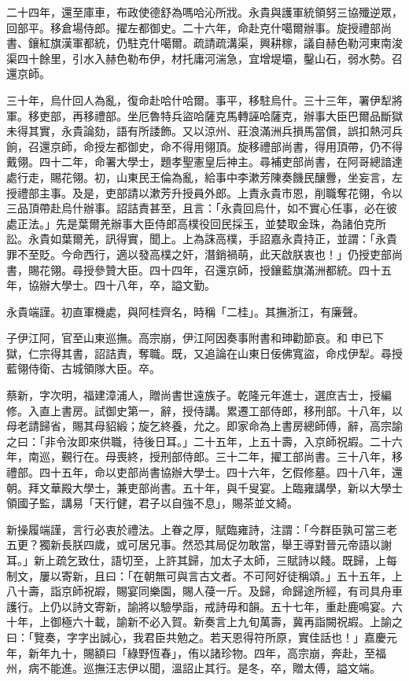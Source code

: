 \begin{pinyinscope}
二十四年，還至庫車，布政使德舒為嗎哈沁所戕。永貴與護軍統領努三協殲逆眾，回部平。移倉場侍郎。擢左都御史。二十六年，命赴克什噶爾辦事。旋授禮部尚書、鑲紅旗漢軍都統，仍駐克什噶爾。疏請疏溝渠，興耕稼，議自赫色勒河東南浚渠四十餘里，引水入赫色勒布伊，材托庸河湍急，宜增堤壩，鑿山石，弱水勢。召還京師。

三十年，烏什回人為亂，復命赴哈什哈爾。事平，移駐烏什。三十三年，署伊犁將軍。移吏部，再移禮部。坐厄魯特兵盜哈薩克馬轉誣哈薩克，辦事大臣巴爾品斷獄未得其實，永貴論劾，語有所諉飾。又以涼州、莊浪滿洲兵損馬當償，誤扣熱河兵餉，召還京師，命授左都御史，命不得用翎頂。旋移禮部尚書，得用頂帶，仍不得戴翎。四十二年，命署大學士，題孝聖憲皇后神主。尋補吏部尚書，在阿哥總諳達處行走，賜花翎。初，山東民王倫為亂，給事中李漱芳陳奏饑民釀釁，坐妄言，左授禮部主事。及是，吏部請以漱芳升授員外郎。上責永貴市恩，削職奪花翎，令以三品頂帶赴烏什辦事。詔詰責甚至，且言：「永貴回烏什，如不實心任事，必在彼處正法。」先是葉爾羌辦事大臣侍郎高樸役回民採玉，並婪取金珠，為諸伯克所訟。永貴如葉爾羌，訊得實，聞上。上為誅高樸，手詔嘉永貴持正，並謂：「永貴罪不至貶。今命西行，適以發高樸之奸，潛銷禍萌，此天啟朕衷也！」仍授吏部尚書，賜花翎。尋授參贊大臣。四十四年，召還京師，授鑲藍旗滿洲都統。四十五年，協辦大學士。四十八年，卒，謚文勤。

永貴端謹。初直軍機處，與阿桂齊名，時稱「二桂」。其撫浙江，有廉聲。

子伊江阿，官至山東巡撫。高宗崩，伊江阿因奏事附書和珅勸節哀。和申已下獄，仁宗得其書，詔詰責，奪職。既，又追論在山東日佞佛寬盜，命戍伊犁。尋授藍翎侍衛、古城領隊大臣。卒。

蔡新，字次明，福建漳浦人，贈尚書世遠族子。乾隆元年進士，選庶吉士，授編修。入直上書房。試御史第一，辭，授侍講。累遷工部侍郎，移刑部。十八年，以母老請歸省，賜其母貂緞；旋乞終養，允之。即家命為上書房總師傅，辭，高宗諭之曰：「非令汝即來供職，待後日耳。」二十五年，上五十壽，入京師祝嘏。二十六年，南巡，覲行在。母喪終，授刑部侍郎。三十二年，擢工部尚書。三十八年，移禮部。四十五年，命以吏部尚書協辦大學士。四十六年，乞假修墓。四十八年，還朝。拜文華殿大學士，兼吏部尚書。五十年，與千叟宴。上臨雍講學，新以大學士領國子監，講易「天行健，君子以自強不息」，賜茶並文綺。

新操履端謹，言行必衷於禮法。上眷之厚，賦臨雍詩，注謂：「今群臣孰可當三老五更？獨新長朕四歲，或可居兄事。然恐其局促勿敢當，舉王導對晉元帝語以謝耳。」新上疏乞致仕，語切至，上許其歸，加太子太師，三賦詩以餞。既歸，上每制文，屢以寄新，且曰：「在朝無可與言古文者。不可阿好徒稱頌。」五十五年，上八十壽，詣京師祝嘏，賜宴同樂園，賜人葠一斤。及歸，命歸途所經，有司具舟車護行。上仍以詩文寄新，諭將以驗學詣，戒詩毋和韻。五十七年，重赴鹿鳴宴。六十年，上御極六十載，諭新不必入賀。新奏言上九旬萬壽，冀再詣闕祝嘏。上諭之曰：「覽奏，字字出誠心，我君臣共勉之。若天恩得符所原，實佳話也！」嘉慶元年，新年九十，賜額曰「綠野恆春」，侑以諸珍物。四年，高宗崩，奔赴，至福州，病不能進。巡撫汪志伊以聞，溫詔止其行。是冬，卒，贈太傅，謚文端。


\end{pinyinscope}
